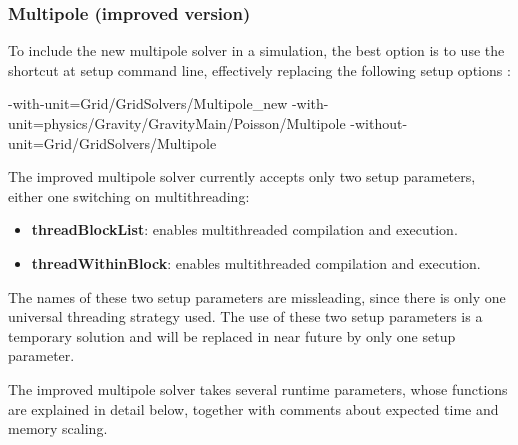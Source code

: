 \subsubsection{Multipole (improved version)}
\label{Sec:GridSolversMultipoleImprovedUsing}

To include the new multipole solver in a simulation, the best option
is to use the shortcut  at setup command line,
effectively replacing the following setup options :
\begin{codeseg}
-with-unit=Grid/GridSolvers/Multipole_new
-with-unit=physics/Gravity/GravityMain/Poisson/Multipole
-without-unit=Grid/GridSolvers/Multipole
\end{codeseg}
The improved multipole solver currently accepts only two setup parameters, either
one switching on multithreading:
\begin{itemize}
\item
{\bf threadBlockList}: enables multithreaded compilation and execution.
\item
{\bf threadWithinBlock}: enables multithreaded compilation and execution.
\end{itemize}
The names of these two setup parameters are missleading, since there is only one
universal threading strategy used. The use of these two setup parameters is a
temporary solution and will be replaced in near future by only one setup parameter.
\par
The improved multipole solver takes several runtime parameters,
whose functions are explained in detail below, together with comments about expected
time and memory scaling.

